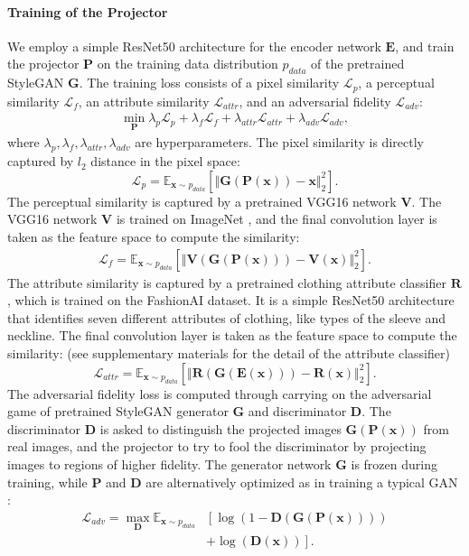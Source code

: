 \documentclass[10pt,twocolumn,letterpaper]{article}
\newcommand{\G}{\bm{G}}
\newcommand{\D}{\bm{D}}
\newcommand{\E}{\bm{E}}
\newcommand{\x}{\bm{x}}
\begin{document}
\paragraph{Training of the Projector} We employ a simple ResNet50 \cite{he2016deep} architecture for the encoder network $\bm{E}$, and train the projector $\bm{P}$ on the training data distribution $p_{data}$ of the pretrained StyleGAN $\bm{G}$. The training loss consists of a pixel similarity $\mathcal{L}_p$, a perceptual similarity $\mathcal{L}_f$, an attribute similarity $\mathcal{L}_{attr}$, and an adversarial fidelity $\mathcal{L}_{adv}$:\begin{gather}
     \min_{\bm{P}}  \lambda_p \mathcal{L}_{p}+\lambda_f\mathcal{L}_f + \lambda_{attr}\mathcal{L}_{attr}+ \lambda_{adv}\mathcal{L}_{adv},\end{gather}
where $\lambda_p,\lambda_f,\lambda_{attr},\lambda_{adv}$ are hyperparameters.
The pixel similarity is directly captured by $l_2$ distance in the pixel space:\begin{equation}
    \mathcal{L}_p=\mathbb{E}_{\x\sim p_{data}}[\Vert\G(\bm{P}(\x))-\x\Vert_2^2].\end{equation}
The perceptual similarity is captured by a pretrained VGG16 network $\bm{V}$. The VGG16 \cite{simonyan2014very} network $\bm{V}$ is trained on ImageNet \cite{deng2009imagenet}, and the final convolution layer is taken as the feature space to compute the similarity:\begin{align}
    \mathcal{L}_f=\mathbb{E}_{\x\sim p_{data}}[\Vert\bm{V}(\G(\bm{P}(\x)))-\bm{V}(\x)\Vert_2^2].\end{align}
The attribute similarity is captured by a pretrained clothing attribute classifier $\bm{R}$, which is trained on the FashionAI \cite{zou2019fashionai} dataset. It is a simple ResNet50 \cite{he2016deep} architecture that identifies seven different attributes of clothing, like types of the sleeve and neckline. The final convolution layer is taken as the feature space to compute the similarity: (see supplementary materials for the detail of the attribute classifier)\begin{equation}
    \mathcal{L}_{attr}=\mathbb{E}_{\x\sim p_{data}}[\Vert\bm{R}(\G(\E(\x)))-\bm{R}(\x)\Vert_2^2].\end{equation}
The adversarial fidelity loss is computed through carrying on the adversarial game of pretrained StyleGAN generator $\bm{G}$ and discriminator $\bm{D}$. The discriminator $\bm{D}$ is asked to distinguish the projected images $\bm{G}(\bm{P}(\bm{x}))$ from real images, and the projector to try to fool the discriminator by projecting images to regions of higher fidelity. The generator network $\bm{G}$ is frozen during training, while $\bm{P}$ and $\bm{D}$ are alternatively optimized as in training a typical GAN \cite{goodfellow2014generative}:\begin{equation}
    \begin{aligned}
       \mathcal{L}_{adv}=\max_{\D}\mathbb{E}_{\x\sim p_{data}}&\left[\log(1-\D(\G(\bm{P}(\x))))\right.\\
    &+\left.\log(\D(\x))\right].
\end{aligned}\end{equation}
\end{document}

